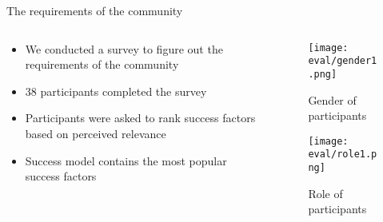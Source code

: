 \begin{frame}{The requirements of the community}
  \begin{columns}
    \begin{column}[]{0.5\textwidth}
      \begin{itemize}
        \item We conducted a survey to figure out the requirements of the community
        \item 38 participants completed the survey
        \item Participants were asked to rank success factors based on perceived relevance
        \item Success model contains the most popular success factors
      \end{itemize}
    \end{column}
    \begin{column}[]{0.35\textwidth}
      \begin{figure}
        \captionsetup{justification=raggedright}
        \caption{Gender of participants}
        \texttt{[image: eval/gender1.png]}
       
      \end{figure}
      \begin{figure}
        \captionsetup{justification=raggedright}
        \caption{Role of participants}
        \texttt{[image: eval/role1.png]}
        
      \end{figure}
     
    \end{column}
  \end{columns}
  
\end{frame}

